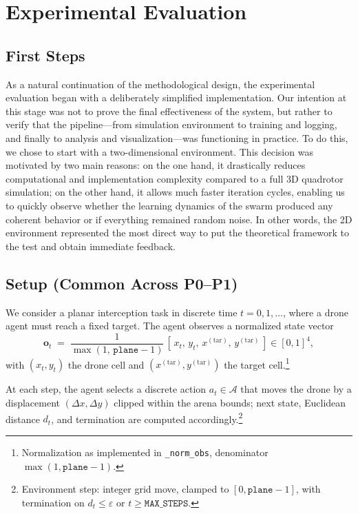 \section{Experimental Evaluation}

    \subsection{First Steps}
        As a natural continuation of the methodological design, the experimental evaluation began with a deliberately simplified implementation. Our intention at this stage was not to prove the final effectiveness of the system, but rather to verify that the pipeline---from simulation environment to training and logging, and finally to analysis and visualization---was functioning in practice. To do this, we chose to start with a two-dimensional environment. This decision was motivated by two main reasons: on the one hand, it drastically reduces computational and implementation complexity compared to a full 3D quadrotor simulation; on the other hand, it allows much faster iteration cycles, enabling us to quickly observe whether the learning dynamics of the swarm produced any coherent behavior or if everything remained random noise. In other words, the 2D environment represented the most direct way to put the theoretical framework to the test and obtain immediate feedback.
        \medskip

    \subsection{Setup (Common Across P0--P1)}
        We consider a planar interception task in discrete time $t=0,1,\dots$, where a drone agent must reach a fixed target. The agent observes a normalized state vector
        \begin{equation}
            \label{eq:obs}
            \mathbf{o}_t \;=\; \frac{1}{\max(1,\,\texttt{plane}-1)}\,[\,x_t,\,y_t,\,x^{(\mathrm{tar})},\,y^{(\mathrm{tar})}\,] \in [0,1]^4,
        \end{equation}
        with $(x_t,y_t)$ the drone cell and $(x^{(\mathrm{tar})},y^{(\mathrm{tar})})$ the target cell.\footnote{Normalization as implemented in \texttt{\_norm\_obs}, denominator $\max(1,\texttt{plane}-1)$.}
        \medskip

        At each step, the agent selects a discrete action $a_t\in\mathcal{A}$ that moves the drone by a displacement $(\Delta x,\Delta y)$ clipped within the arena bounds; next state, Euclidean distance $d_t$, and termination are computed accordingly.\footnote{Environment step: integer grid move, clamped to $[0,\texttt{plane}-1]$, with termination on $d_t\le\varepsilon$ or $t\ge\texttt{MAX\_STEPS}$.}

